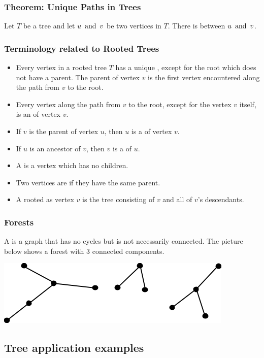 \subsubsection*{Theorem: Unique Paths in Trees}
Let $T$ be a tree and let $u \operatorname{~\text{and}~} v$ be two vertices in $T$. There is  between $u \operatorname{~\text{and}~} v$.

\subsubsection*{Terminology related to Rooted Trees}
\begin{itemize}
  \item Every vertex in a rooted tree $T$ has a unique , except for the root which does not have a parent. The parent of vertex $v$ is the first vertex encountered along the path from $v$ to the root.
  \item Every vertex along the path from $v$ to the root, except for the vertex $v$ itself, is an  of vertex $v$.
  \item If $v$ is the parent of vertex $u$, then $u$ is a  of vertex $v$.
  \item If $u$ is an ancestor of $v$, then $v$ is a  of $u$.
  \item A  is a vertex which has no children.
  \item Two vertices are  if they have the same parent.
  \item A  rooted as vertex $v$ is the tree consisting of $v$ and all of $v$'s descendants.
\end{itemize}

\subsubsection*{Forests}
A  is a graph that has no cycles but is not necessarily connected. The picture below shows a forest with 3 connected components.
\begin{center}
  \includegraphics[width=0.6\linewidth]{resources/forest example.png}
\end{center}

\subsection{Tree application examples}

